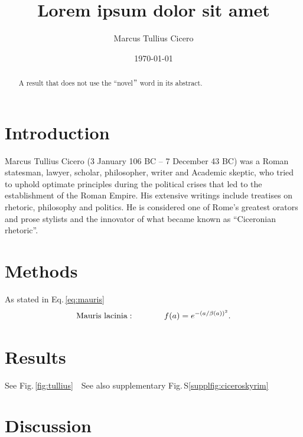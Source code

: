 \documentclass[fleqn]{scrartcl}%
\title{Lorem ipsum dolor sit amet}%
\author{Marcus Tullius Cicero}%
\date{\today}%
\begin{document}
    \maketitle
    \begin{abstract}
        A result that does not use the ``novel\("\) word in its abstract.
    \end{abstract}


    \clearpage
    \section*{Introduction}
    Marcus Tullius Cicero (3 January 106 BC – 7 December 43 BC) was a Roman statesman, lawyer, scholar, philosopher,
    writer and Academic skeptic, who tried to uphold optimate principles during the political crises that led to the
    establishment of the Roman Empire.\cite{abalem2018double}
    His extensive writings include treatises on rhetoric, philosophy and politics.
    He is considered one of Rome's greatest orators and prose stylists
    and the innovator of what became known as ``Ciceronian rhetoric''.

    \clearpage
    \section*{Methods}
    As stated in Eq.\,\ref{eq:mauris}
    \newline
    \blindtext
    \begin{align}\label{eq:mauris}
        \textnormal{Mauris lacinia}: \hspace{0.5in}	 f(a) = e^{-(a/\beta(a))^2}.
    \end{align}



    \clearpage
    \section*{Results}
    See Fig.\,\ref{fig:tullius}
    \newline
    \blindtext\,\
    See also supplementary Fig.\,S\ref{supplfig:ciceroskyrim}


    \clearpage
    \section*{Discussion}
    \blindtext
\end{document}
